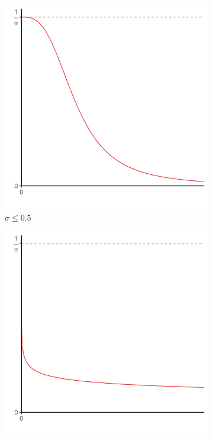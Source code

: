 \begin{figure}[tb]
	\begin{subfigure}[t]{0.32\linewidth}
		\centering
		\includegraphics[width=1\linewidth]{../result/appendix_A/function_h/graph_1.png} 
		\caption{$\sigma \leq 0.5$} 
		\label{fig:h_shape_1} 
	\end{subfigure}
	\begin{subfigure}[t]{0.32\linewidth}
		\centering
		\includegraphics[width=1\linewidth]{../result/appendix_A/function_h/graph_2.png} 

\end{subfigure}
\end{figure}
